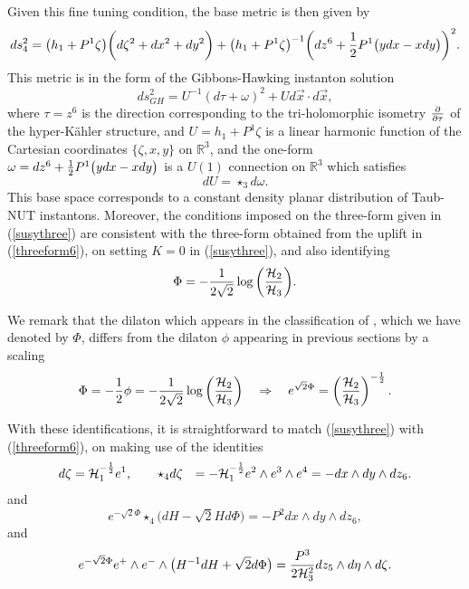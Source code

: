 Given this fine tuning condition, the base metric is then given by
\begin{equation}
ds^2_4 = \big(h_1 + P^1 \zeta\big)\bigg( d\zeta^2 + dx^2 + dy^2 \bigg)
+\big(h_1 + P^1 \zeta\big)^{-1} \bigg(dz^6 +{1 \over 2} P^1 \big(ydx-x dy\big) \bigg)^2.
\end{equation}
This metric is in the form of the Gibbons-Hawking instanton solution
\cite{Gibbons:1979zt, Gibbons:1987sp}
\begin{equation*}
ds^2_{GH} = U^{-1} (d\tau + \omega)^2 + U d\vec{x} \cdot d\vec{x}    ,
\end{equation*}
where $\tau=z^6$ is the direction corresponding to the tri-holomorphic isometry
${\partial \over \partial \tau}$ of the hyper-K\"ahler structure, and
$U=h_1+P^1 \zeta$ is a linear harmonic function of the Cartesian coordinates $\{\zeta, x, y \}$ on $\mathbb{R}^3$, and the one-form $\omega = dz^6 +{1 \over 2} P^1 \big(ydx-x dy\big) $ is a $U(1)$ connection on $\mathbb{R}^3$ which satisfies
\begin{equation}
    dU = \star_3 d \omega.
\end{equation}
This base space corresponds to a constant density planar distribution of Taub-NUT instantons. Moreover, the conditions imposed on the three-form given in
({\ref{susythree}}) are consistent with the three-form obtained from
the uplift in ({\ref{threeform6}}), on setting $K=0$ in ({\ref{susythree}}),
and also identifying
\begin{equation}
\Phi=-{1 \over 2 \sqrt{2}} \log \bigg({{\cal H}_2 \over {\cal H}_3} \bigg).
\end{equation}

We remark that the dilaton which appears in the classification of
\cite{Cariglia:2004kk}, which we have denoted by $\Phi$, differs from the
dilaton $\phi$ appearing in previous sections by a scaling
\begin{equation*}
    \Phi = -\frac{1}{2} \phi = -\frac{1}{2\sqrt{2}} \log \left(\frac{{\cal H}_2}{{\cal H}_3} \right) \quad \Rightarrow \quad e^{\sqrt{2} \Phi} = \left( \frac{{\cal H}_2}{{\cal H}_3}\right)^{-\frac{1}{2}}.
\end{equation*}


With these identifications, it is straightforward to match ({\ref{susythree}})
with ({\ref{threeform6}}), on making use of the identities
\begin{equation}
\begin{aligned}
        d\zeta &= {\cal H}_1^{-\frac{1}{2}} e^1, \qquad
        \star_4 d\zeta &= - {\cal H}_1^{-\frac{1}{2}} e^2 \wedge e^3 \wedge e^4
        = - dx \wedge dy \wedge dz_6.
\end{aligned}
\label{hzeta}
\end{equation}
and
\begin{equation}
e^{-\sqrt{2} \Phi} \star_4 \big(dH-\sqrt{2} H d \Phi \big)=- P^2 dx \wedge dy \wedge dz_6,
\end{equation}
and
\begin{equation}
e^{-\sqrt{2} \Phi} e^+ \wedge e^- \wedge \big(H^{-1} dH +\sqrt{2} d \Phi \big)
={P^3 \over 2 {\cal H}_3^2} dz_5 \wedge d \eta \wedge d \zeta.
\end{equation}

